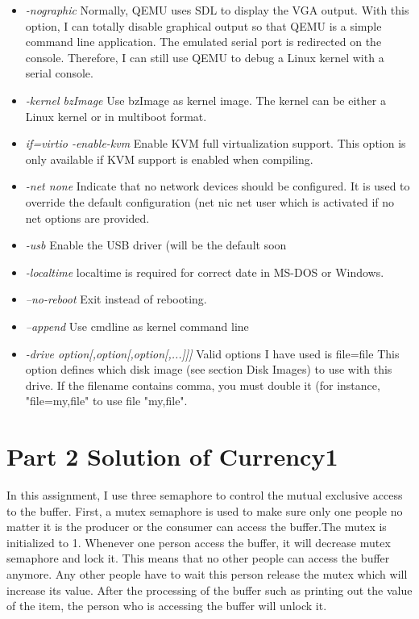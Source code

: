 \documentclass[10pt,draftclsnofoot,peerreview,letterpaper,onecolumn,]{IEEEtran}
\begin{document}
\begin{itemize}
\item \emph{-nographic} Normally, QEMU uses SDL to display the VGA output. With this option, I can totally disable graphical output so that QEMU is a simple command line application. The emulated serial port is redirected on the console. Therefore, I can still use QEMU to debug a Linux kernel with a serial console.
\item \emph{-kernel bzImage} Use bzImage as kernel image. The kernel can be either a Linux kernel or in multiboot format.
\item \emph{if=virtio -enable-kvm} Enable KVM full virtualization support. This option is only available if KVM support is enabled when compiling.
\item \emph{-net none} Indicate that no network devices should be configured. It is used to override the default configuration (\-net nic \-net user which is activated if no \-net options are provided.
\item \emph{-usb}  Enable the USB driver (will be the default soon
\item \emph{-localtime}  localtime is required for correct date in MS-DOS or Windows.
\item \emph{--no-reboot} Exit instead of rebooting.
\item \emph{--append} Use cmdline as kernel command line
\item \emph{-drive option[,option[,option[,...]]]} Valid options I have used is \:
file=file
This option defines which disk image (see section Disk Images) to use with this drive. If the filename contains comma, you must double it (for instance, "file=my,file" to use file "my,file".
\end{itemize}

\section{Part 2 Solution of Currency1}

In this assignment, I use three semaphore to control the mutual exclusive access to the buffer. First, a mutex semaphore is used to make sure only one people no matter it is the producer or the consumer can access the buffer.The mutex is initialized to 1.  Whenever one person access the buffer, it will decrease mutex semaphore and lock it. This means that no other people can access the buffer anymore. Any other people have to wait this person release the mutex which will increase its value. After the processing of the buffer such as printing out the value of the item, the person who is accessing the buffer will unlock it.
\end{document}
